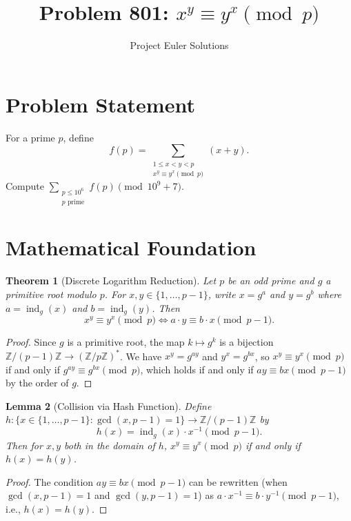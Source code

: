 \documentclass[11pt]{article}
\title{Problem 801: $x^y \equiv y^x \pmod{p}$}
\author{Project Euler Solutions}
\date{}
\newtheorem{theorem}{Theorem}
\newtheorem{lemma}[theorem]{Lemma}
\begin{document}
\maketitle

\section{Problem Statement}

For a prime $p$, define
\[
f(p) = \sum_{\substack{1 \le x < y < p \\ x^y \equiv y^x \pmod{p}}} (x + y).
\]
Compute $\displaystyle\sum_{\substack{p \le 10^6 \\ p \text{ prime}}} f(p) \pmod{10^9 + 7}$.

\section{Mathematical Foundation}

\begin{theorem}[Discrete Logarithm Reduction]
Let $p$ be an odd prime and $g$ a primitive root modulo $p$. For $x, y \in \{1, \ldots, p-1\}$, write $x = g^a$ and $y = g^b$ where $a = \operatorname{ind}_g(x)$ and $b = \operatorname{ind}_g(y)$. Then
\[
x^y \equiv y^x \pmod{p} \iff a \cdot y \equiv b \cdot x \pmod{p-1}.
\]
\end{theorem}

\begin{proof}
Since $g$ is a primitive root, the map $k \mapsto g^k$ is a bijection $\mathbb{Z}/(p-1)\mathbb{Z} \to (\mathbb{Z}/p\mathbb{Z})^*$. We have $x^y = g^{ay}$ and $y^x = g^{bx}$, so $x^y \equiv y^x \pmod{p}$ if and only if $g^{ay} \equiv g^{bx} \pmod{p}$, which holds if and only if $ay \equiv bx \pmod{p-1}$ by the order of $g$.
\end{proof}

\begin{lemma}[Collision via Hash Function]
Define $h : \{x \in \{1, \ldots, p-1\} : \gcd(x, p-1) = 1\} \to \mathbb{Z}/(p-1)\mathbb{Z}$ by
\[
h(x) = \operatorname{ind}_g(x) \cdot x^{-1} \pmod{p-1}.
\]
Then for $x, y$ both in the domain of $h$, $x^y \equiv y^x \pmod{p}$ if and only if $h(x) = h(y)$.
\end{lemma}

\begin{proof}
The condition $ay \equiv bx \pmod{p-1}$ can be rewritten (when $\gcd(x, p-1) = 1$ and $\gcd(y, p-1) = 1$) as $a \cdot x^{-1} \equiv b \cdot y^{-1} \pmod{p-1}$, i.e., $h(x) = h(y)$.
\end{proof}
\end{document}
